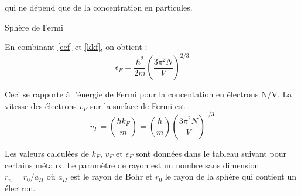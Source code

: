 qui ne dépend que de la concentration en particules.

\begin{marginfigure}
    \TODO
    \caption{Sphère de Fermi}
    \label{spherefermi}
\end{marginfigure}

En combinant \ref{eef} et \ref{kkf}, on obtient :
\begin{equation}
    \epsilon_F = \frac{\hbar^2}{2m} \left(\frac{3\pi^2N}{V}\right)^{2/3}
    \label{ef}
\end{equation}

Ceci se rapporte à l'énergie de Fermi pour la concentation en électrons N/V. La
vitesse des électrons $v_F$ sur la surface de Fermi est :
\begin{equation}
    v_F = \left( \frac{\hbar k_F}{m}\right)
    = \left( \frac{\hbar}{m} \right)\left(\frac{3\pi^2 N}{V} \right)^{1/3}
\end{equation}

Les valeurs calculées de $k_F$, $v_F$ et $\epsilon_F$ sont données dans le
tableau suivant pour certains métaux. Le paramètre de rayon est un nombre sans
dimension $r_n = r_0/a_H$ où $a_H$ est le rayon de Bohr et $r_0$ le rayon de la
sphère qui contient un électron.

